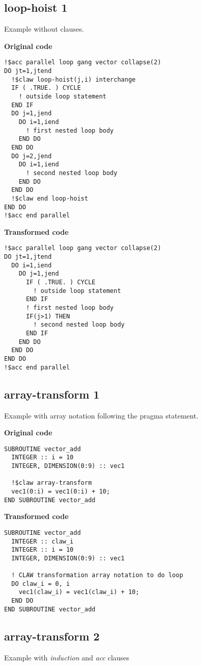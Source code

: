 \subsection{loop-hoist 1}
\label{loop-hoist1}
Example without clauses. 

\textbf{Original code}
\begin{lstlisting}
!$acc parallel loop gang vector collapse(2)
DO jt=1,jtend
  !$claw loop-hoist(j,i) interchange
  IF ( .TRUE. ) CYCLE
    ! outside loop statement
  END IF
  DO j=1,jend
    DO i=1,iend
      ! first nested loop body
    END DO
  END DO
  DO j=2,jend
    DO i=1,iend
      ! second nested loop body
    END DO
  END DO
  !$claw end loop-hoist
END DO
!$acc end parallel
\end{lstlisting}


\textbf{Transformed code}
\begin{lstlisting}
!$acc parallel loop gang vector collapse(2)
DO jt=1,jtend
  DO i=1,iend
    DO j=1,jend
      IF ( .TRUE. ) CYCLE
        ! outside loop statement
      END IF
      ! first nested loop body
      IF(j>1) THEN
        ! second nested loop body
      END IF
    END DO
  END DO
END DO
!$acc end parallel
\end{lstlisting}


\subsection{array-transform 1}
\label{array-transform1}
Example with array notation following the pragma statement. 

\textbf{Original code}
\begin{lstlisting}
SUBROUTINE vector_add
  INTEGER :: i = 10
  INTEGER, DIMENSION(0:9) :: vec1

  !$claw array-transform
  vec1(0:i) = vec1(0:i) + 10;
END SUBROUTINE vector_add
\end{lstlisting}

\textbf{Transformed code}
\begin{lstlisting}
SUBROUTINE vector_add
  INTEGER :: claw_i
  INTEGER :: i = 10
  INTEGER, DIMENSION(0:9) :: vec1

  ! CLAW transformation array notation to do loop
  DO claw_i = 0, i
    vec1(claw_i) = vec1(claw_i) + 10;
  END DO
END SUBROUTINE vector_add
\end{lstlisting}


\subsection{array-transform 2}
\label{array-transform2}
Example with \textit{induction} and \textit{acc} clauses

